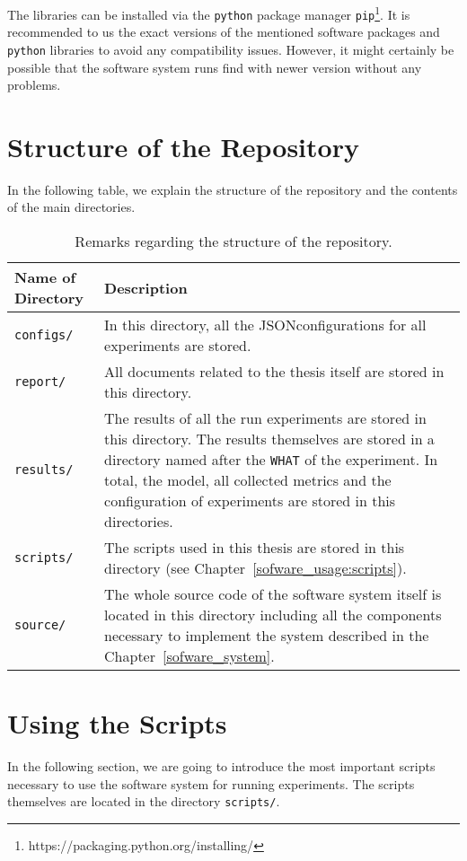 The libraries can be installed via the \texttt{python} package manager \texttt{pip}\footnote{https://packaging.python.org/installing/}. It is recommended to us the exact versions of the mentioned software packages and \texttt{python} libraries to avoid any compatibility issues. However, it might certainly be possible that the software system runs find with newer version without any problems.

\clearpage
\section{Structure of the Repository}
In the following table, we explain the structure of the repository and the contents of the main directories.

\begin{table}[H]
	\centering
	\begin{tabularx}{\textwidth}{lX}
		\toprule
		Name of Directory & Description\\ \midrule
		\texttt{configs/} & In this directory, all the JSONconfigurations for all experiments are stored.\\
		\texttt{report/} & All documents related to the thesis itself are stored in this directory.\\
		\texttt{results/} & The results of all the run experiments are stored in this directory. The results themselves are stored in a directory named after the \texttt{WHAT} of the experiment. In total, the model, all collected metrics and the configuration of experiments are stored in this directories.\\
		\texttt{scripts/} & The scripts used in this thesis are stored in this directory (see Chapter~\ref{sofware_usage:scripts}).\\
		\texttt{source/} & The whole source code of the software system itself is located in this directory including all the components necessary to implement the system described in the Chapter~\ref{sofware_system}.\\
		\bottomrule
	\end{tabularx}
	\caption{Remarks regarding the structure of the repository.}
\end{table}

\clearpage
\section{Using the Scripts}
In the following section, we are going to introduce the most important scripts necessary to use the software system for running experiments. The scripts themselves are located in the directory \texttt{scripts/}.

